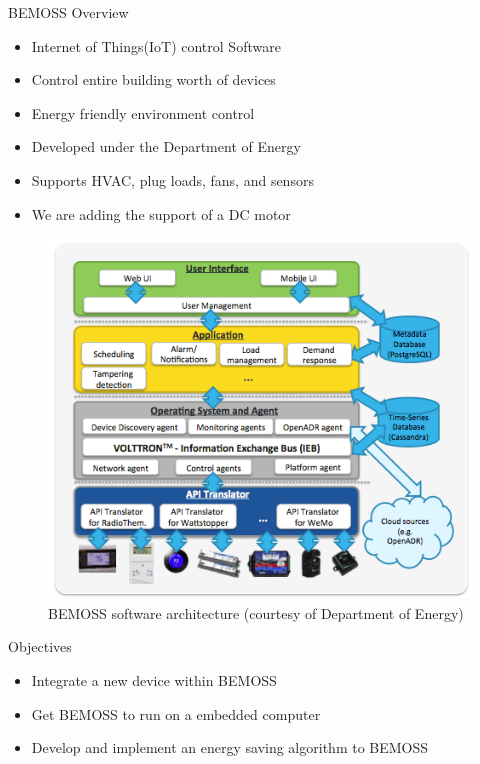 \documentclass[final]{beamer}
\newlength{\onecolwid}
\begin{document}
\begin{frame}[t]
\begin{columns}[t]
\begin{column}{\onecolwid}
\vskip -1cm
\begin{block}{BEMOSS Overview}
\vskip -1cm
\begin{itemize}
    \item Internet of Things(IoT) control Software
    \item Control entire building worth of devices
    \item Energy friendly environment control 
    \item Developed under the Department of Energy
    \item Supports HVAC, plug loads, fans, and sensors
    \item We are adding the support of a DC motor
\end{itemize}

\begin{figure}
    \centering
    \includegraphics[width=.99\textwidth]{figs/img/BEMOSSv2_SoftwareArchitecture.png}
    \caption{BEMOSS software architecture (courtesy of Department of Energy)}
    \label{fig:my_label}
\end{figure}

\begin{alertblock}{Objectives}
%
\begin{itemize}
    \item Integrate a new device within BEMOSS
    \item Get BEMOSS to run on a embedded computer
    \item Develop and implement an energy saving algorithm to BEMOSS
\end{itemize}
%
\vskip -1cm


\end{alertblock}
\end{block}
\end{column}
\end{columns}
\end{frame}
\end{document}
